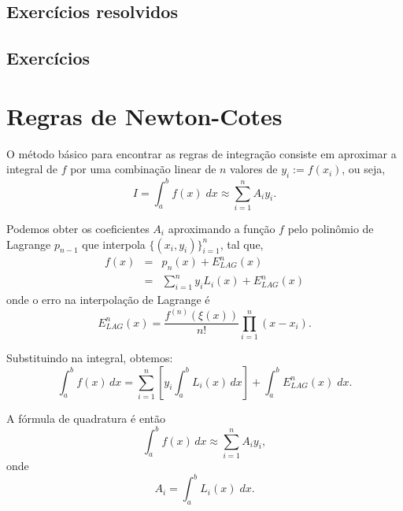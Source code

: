 \subsection*{Exercícios resolvidos}

\construirExeresol

\subsection*{Exercícios}

\construirExer


\section{Regras de Newton-Cotes}


O método básico para encontrar as regras de integração consiste em aproximar a integral de $f$ por uma combinação linear de $n$ valores de $y_i := f(x_i)$, ou seja,
\begin{equation}
I = \int_a^b f(x) \;dx \approx \sum_{i=1}^nA_iy_i.
\end{equation}


Podemos obter os coeficientes $A_i$ aproximando a função $f$ pelo polinômio de Lagrange $p_{n-1}$ que interpola $\{(x_i,y_i)\}_{i=1}^n$, tal que,
\begin{eqnarray}
  f(x) &=& p_n(x)+E^n_{LAG}(x) \\
       &=& \sum_{i=1}^n y_iL_i(x)+E^n_{LAG}(x)
\end{eqnarray}
onde o erro na interpolação de Lagrange é
\begin{equation}
   E^n_{LAG}(x)=\frac{f^{(n)}(\xi(x))}{n!}\prod_{i=1}^n(x-x_i).
\end{equation}

Substituindo na integral, obtemos:
\begin{equation}
  \int_a^bf(x)\,dx = \sum_{i=1}^n\left[y_i\int_a^bL_i(x)\,dx\right] +  \int_a^b E^n_{LAG}(x) \;dx.
\end{equation}

A fórmula de quadratura é então
\begin{equation}
  \int_a^bf(x)\,dx\approx\sum_{i=1}^nA_iy_i,
\end{equation}
onde
\begin{equation}
  A_i=\int_a^b L_i(x)\;dx.
\end{equation}

